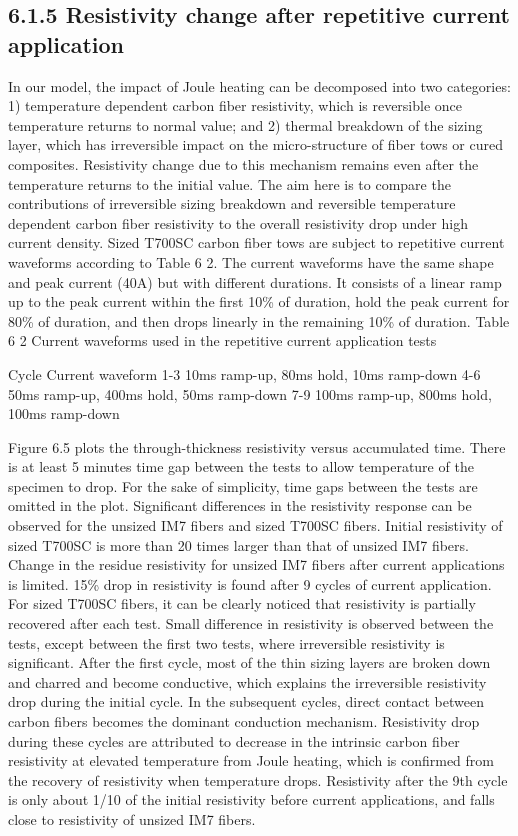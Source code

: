 \subsection{6.1.5	Resistivity change after repetitive current application}
In our model, the impact of Joule heating can be decomposed into two categories: 1) temperature dependent carbon fiber resistivity, which is reversible once temperature returns to normal value; and 2) thermal breakdown of the sizing layer, which has irreversible impact on the micro-structure of fiber tows or cured composites. Resistivity change due to this mechanism remains even after the temperature returns to the initial value.
The aim here is to compare the contributions of irreversible sizing breakdown and reversible temperature dependent carbon fiber resistivity to the overall resistivity drop under high current density. Sized T700SC carbon fiber tows are subject to repetitive current waveforms according to Table 6 2. The current waveforms have the same shape and peak current (40A) but with different durations. It consists of a linear ramp up to the peak current within the first 10\% of duration, hold the peak current for 80\% of duration, and then drops linearly in the remaining 10\% of duration.  
Table 6 2 Current waveforms used in the repetitive current application tests

Cycle 	Current waveform
1-3	10ms ramp-up, 80ms hold, 10ms ramp-down
4-6	50ms ramp-up, 400ms hold, 50ms ramp-down
7-9	100ms ramp-up, 800ms hold, 100ms ramp-down

Figure 6.5 plots the through-thickness resistivity versus accumulated time. There is at least 5 minutes time gap between the tests to allow temperature of the specimen to drop. For the sake of simplicity, time gaps between the tests are omitted in the plot. 
Significant differences in the resistivity response can be observed for the unsized IM7 fibers and sized T700SC fibers. Initial resistivity of sized T700SC is more than 20 times larger than that of unsized IM7 fibers.
Change in the residue resistivity for unsized IM7 fibers after current applications is limited. 15\% drop in resistivity is found after 9 cycles of current application. For sized T700SC fibers, it can be clearly noticed that resistivity is partially recovered after each test. Small difference in resistivity is observed between the tests, except between the first two tests, where irreversible resistivity is significant. After the first cycle, most of the thin sizing layers are broken down and charred and become conductive, which explains the irreversible resistivity drop during the initial cycle. In the subsequent cycles, direct contact between carbon fibers becomes the dominant conduction mechanism. Resistivity drop during these cycles are attributed to decrease in the intrinsic carbon fiber resistivity at elevated temperature from Joule heating, which is confirmed from the recovery of resistivity when temperature drops. Resistivity after the 9th cycle is only about 1/10 of the initial resistivity before current applications, and falls close to resistivity of unsized IM7 fibers.

